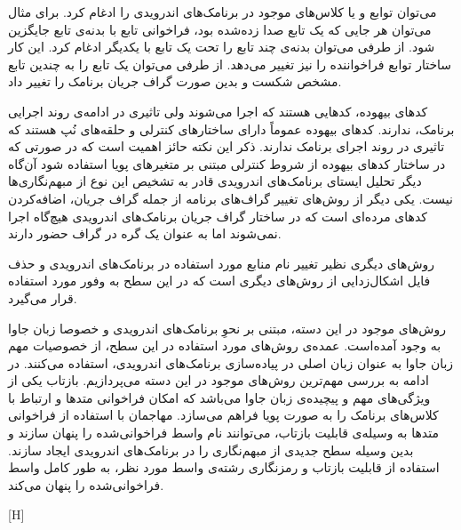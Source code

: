   می‌توان توابع و یا کلاس‌های موجود در برنامک‌های اندرویدی را ادغام کرد. برای مثال می‌توان هر جایی که یک تابع صدا زده‌شده بود، فراخوانی تابع با بدنه‌ی تابع جایگزین شود. از طرفی می‌توان بدنه‌ی چند تابع را تحت یک تابع با یکدیگر ادغام کرد. این کار ساختار توابع فراخواننده را نیز تغییر می‌دهد. از طرفی می‌توان یک تابع را به چندین تابع مشخص شکست و بدین صورت گراف جریان برنامک‌ را تغییر داد.

  کد‌های بیهوده‌، کد‌هایی هستند که اجرا می‌شوند ولی تاثیری در ادامه‌ی روند اجرایی برنامک، ندارند. کد‌های بیهوده عموماً دارای ساختار‌های کنترلی و حلقه‌های نُپ هستند که تاثیری در روند اجرای برنامک ندارند. ذکر این نکته حائز اهمیت است که در صورتی که در ساختار کد‌های بیهوده از شروط کنترلی مبتنی بر متغیر‌های پویا استفاده شود آن‌گاه دیگر تحلیل ایستای برنامک‌های اندرویدی قادر به تشخیص این نوع از مبهم‌نگاری‌ها نیست.
 
یکی دیگر از روش‌های تغییر گراف‌های برنامه از جمله گراف جریان، اضافه‌کردن کد‌های مرده‌ای است که در ساختار گراف‌ جریان برنامک‌های اندرویدی هیچ‌گاه اجرا نمی‌شوند اما به عنوان یک گره در گراف حضور دارند. 
 
   روش‌های دیگری نظیر تغییر نام منابع مورد استفاده در برنامک‌های اندرویدی و حذف فایل اشکال‌زدایی از روش‌های دیگری است که در این سطح به وفور مورد استفاده قرار می‌گیرد.

\label{khakestari}
روش‌های موجود در این دسته، مبتنی بر نحوِ برنامک‌های اندرویدی و خصوصا زبان جاوا به وجود آمده‌است. عمده‌ی روش‌های مورد استفاده در این سطح، از خصوصیات مهم زبان جاوا به عنوان زبان اصلی در پیاده‌سازی برنامک‌های اندرویدی، استفاده می‌کنند. در ادامه به بررسی مهم‌ترین روش‌های موجود در این دسته می‌پردازیم.
  بازتاب یکی از ویژگی‌های مهم و پیچیده‌ی زبان جاوا می‌باشد که امکان فراخوانی‌ متد‌ها و ارتباط با کلاس‌های برنامک را به صورت پویا فراهم می‌سازد. مهاجمان با استفاده از فراخوانی متد‌ها به وسیله‌ی قابلیت بازتاب، می‌توانند نام واسط فراخوانی‌شده را پنهان سازند و بدین وسیله سطح جدیدی از مبهم‌نگاری را در برنامک‌های اندرویدی ایجاد سازند. استفاده از قابلیت بازتاب و رمز‌نگاری رشته‌ی واسط مورد نظر، به طور کامل واسط فراخوانی‌شده را پنهان می‌کند. 


[H]
\vspace{1em}

